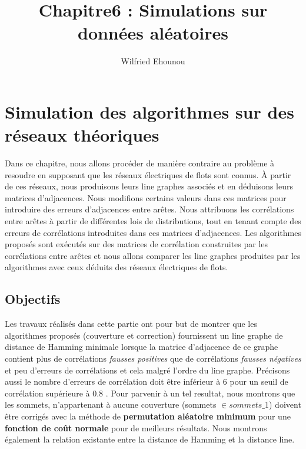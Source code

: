 \documentclass[onecolumn, 12pt]{book}
\title{Chapitre6 : Simulations sur donn\'ees al\'eatoires}
\author{Wilfried Ehounou}
\date{\oldstylenums{\today}}
\begin{document}
\maketitle
\tableofcontents

\chapter{Simulation des algorithmes sur des r\'eseaux th\'eoriques}
Dans ce chapitre, nous allons proc\'eder de mani\`ere contraire au probl\`eme \`a resoudre en supposant que les r\'eseaux \'electriques de flots sont connus. 
\`A partir de ces r\'eseaux, nous produisons leurs line graphes associ\'es et en d\'eduisons leurs matrices d'adjacences. 
Nous modifions certains valeurs dans ces matrices pour introduire des erreurs d'adjacences entre ar\^etes. \newline
Nous attribuons les corr\'elations entre ar\^etes \`a partir de diff\'erentes lois de distributions, tout en tenant compte des erreurs de corr\'elations introduites dans ces matrices d'adjacences. \newline
Les algorithmes propos\'es sont ex\'ecut\'es sur des matrices de corr\'elation construites par les corr\'elations entre ar\^etes et nous allons comparer les line graphes produites par les algorithmes avec ceux d\'eduits des r\'eseaux \'electriques de flots. 


\section{Objectifs}
Les travaux r\'ealis\'es dans cette partie ont pour but de montrer que les algorithmes propos\'es (couverture et correction) fournissent un line graphe de distance de Hamming minimale lorsque la matrice d'adjacence de ce graphe contient plus de corr\'elations {\em fausses positives} que de corr\'elations {\em fausses n\'egatives} et peu d'erreurs de corr\'elations et cela malgr\'e l'ordre du line graphe. Pr\'ecisons aussi le nombre d'erreurs de corr\'elation  doit \^etre inf\'erieur \`a $6$ pour un seuil de corr\'elation sup\'erieure \`a $0.8$ . \newline
Pour parvenir \`a un tel resultat, nous montrons que les sommets, n'appartenant \`a aucune couverture (sommets $\in sommets\_1$) doivent \^etre corrig\'es avec la m\'ethode de {\bf permutation al\'eatoire minimum} pour une {\bf fonction de co\^ut normale} pour de meilleurs r\'esultats.
Nous montrons \'egalement la relation existante entre la distance de Hamming et la distance line.
\end{document}
